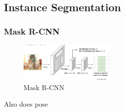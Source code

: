 \subsection{Instance Segmentation}

\subsubsection{Mask R-CNN}
\begin{figure}[!htb]
    \centering
    \includegraphics[width=0.42\textwidth]{pic/Lec11/Mask R-CNN}
    \caption{Mask R-CNN}
\end{figure}

Also does pose
